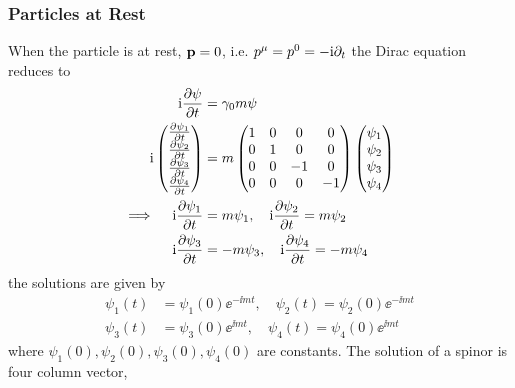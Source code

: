 \subsubsection{Particles at Rest}
When the particle is at rest, $\mathbf{p} = 0$, i.e. $p^ \mu = p^0 = -\mathrm{i} \partial_t$ the Dirac equation reduces to 
\begin{align*}
    \mathrm{i} \frac{\partial \psi}{\partial t} &= \gamma_0 m \psi \\
    \mathrm{i} \begin{pmatrix}
        \frac{\partial \psi_1}{\partial t} \\
        \frac{\partial \psi_2}{\partial t} \\
        \frac{\partial \psi_3}{\partial t} \\
        \frac{\partial \psi_4}{\partial t}
    \end{pmatrix} &= m \begin{pmatrix}
        1 & 0 & 0 & 0 \\
        0 & 1 & 0 & 0 \\
        0 & 0 & -1 & 0 \\
        0 & 0 & 0 & -1
    \end{pmatrix} \begin{pmatrix}
        \psi_1 \\
        \psi_2 \\
        \psi_3 \\
        \psi_4
    \end{pmatrix} \\
    \implies \quad \mathrm{i} \frac{\partial \psi_1}{\partial t} &= m \psi_1, \quad \mathrm{i} \frac{\partial \psi_2}{\partial t} = m \psi_2 \\
    \mathrm{i} \frac{\partial \psi_3}{\partial t} &= - m \psi_3, \quad \mathrm{i} \frac{\partial \psi_4}{\partial t} = - m \psi_4
\end{align*}
the solutions are given by 
\begin{align}
    \psi_1(t) &= \psi_1(0) \ee^{-\ii m t}, \quad \psi_2(t) = \psi_2(0) \ee^{-\ii m t} \\
    \psi_3(t) &= \psi_3(0) \ee^{\ii m t}, \quad \psi_4(t) = \psi_4(0) \ee^{\ii m t}
\end{align}
where $\psi_1(0), \psi_2(0), \psi_3(0), \psi_4(0)$ are constants. The solution of a spinor is four column vector,
